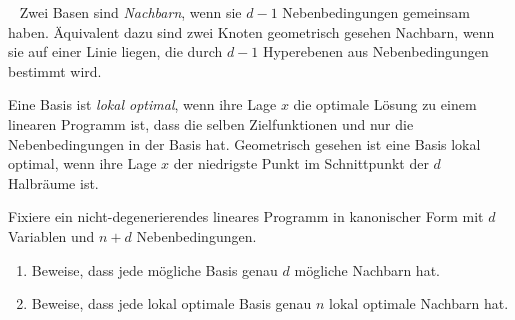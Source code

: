 \documentclass{uebung_cs}
\begin{document}
\begin{aufgabe}\
%
%
	Zwei Basen sind \emph{Nachbarn}, wenn sie $d-1$ Nebenbedingungen gemeinsam haben. Äquivalent dazu sind zwei Knoten geometrisch gesehen Nachbarn, wenn sie auf einer Linie liegen, die durch $d-1$ Hyperebenen aus Nebenbedingungen bestimmt wird.
	
	Eine Basis ist \emph{lokal optimal}, wenn ihre Lage $x$ die optimale Lösung zu einem linearen Programm ist, dass die selben Zielfunktionen und nur die Nebenbedingungen in der Basis hat. Geometrisch gesehen ist eine Basis lokal optimal, wenn ihre Lage $x$ der niedrigste Punkt im Schnittpunkt der $d$ Halbräume ist.
	
	Fixiere ein nicht-degenerierendes lineares Programm in kanonischer Form mit $d$ Variablen und $n + d$ Nebenbedingungen.
	\begin{enumerate}
		\item Beweise, dass jede mögliche Basis genau $d$ mögliche Nachbarn hat.
		\item Beweise, dass jede lokal optimale Basis genau $n$ lokal optimale Nachbarn hat.
	\end{enumerate}
\end{aufgabe}
\end{document}
